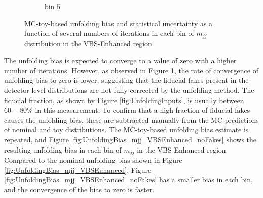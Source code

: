 \begin{figure}[htb]
\begin{subfigure}{.48\textwidth}
        \caption{bin 5 }
    \end{subfigure}
    \caption{ MC-toy-based unfolding bias and statistical uncertainty as a function of several numbers of iterations in each bin of $m_{jj}$ distribution in the VBS-Enhanced region. \label{fig:UnfoldingBiasStat_mjj_VBSEnhanced}}
\end{figure}

The unfolding bias is expected to converge to a value of zero with a higher number of iterations. However, as observed in Figure \ref{fig:UnfoldingBiasStat_mjj_VBSEnhanced}, the rate of convergence of unfolding bias to zero is lower, suggesting that the fiducial fakes present in the detector level distributions are not fully corrected by the unfolding method. The fiducial fraction, as shown by Figure \ref{fig:UnfoldingInputs}, is usually between $60-80\%$ in this measurement. To confirm that a high fraction of fiducial fakes causes the unfolding bias, these are subtracted manually from the MC predictions of nominal and toy distributions. The MC-toy-based unfolding bias estimate is repeated, and Figure \ref{fig:UnfoldingBias_mjj_VBSEnhanced_noFakes} shows the resulting unfolding bias in each bin of $m_{jj}$ in the VBS-Enhanced region. Compared to the nominal unfolding bias shown in Figure \ref{fig:UnfoldingBias_mjj_VBSEnhanced}, Figure \ref{fig:UnfoldingBias_mjj_VBSEnhanced_noFakes} has a smaller bias in each bin, and the convergence of the bias to zero is faster.

